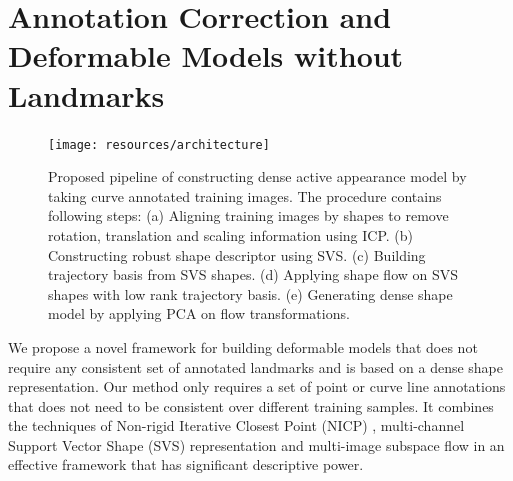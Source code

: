 \chapter{Annotation Correction and Deformable Models without Landmarks}



\begin{figure}[h]
    \centering
        \texttt{[image: resources/architecture]}
    \caption{Proposed pipeline of constructing dense active appearance model by taking curve annotated training images. The procedure contains following steps: (a) Aligning training images by shapes to remove rotation, translation and scaling information using ICP. (b) Constructing robust shape descriptor using SVS. (c) Building trajectory basis from SVS shapes. (d) Applying shape flow on SVS shapes with low rank trajectory basis. (e) Generating dense shape model by applying PCA on flow transformations.}
    \label{fig:archi}
\end{figure}

We propose a novel framework for building deformable models that does not require any consistent set of annotated landmarks and is based on a dense shape representation. Our method only requires a set of point or curve line annotations that does not need to be consistent over different training samples. It combines the techniques of Non-rigid Iterative Closest Point (NICP) \cite{Amberg2007}, multi-channel Support Vector Shape (SVS) \cite{Nguyen2013} representation and multi-image subspace flow in an effective framework that has significant descriptive power.


